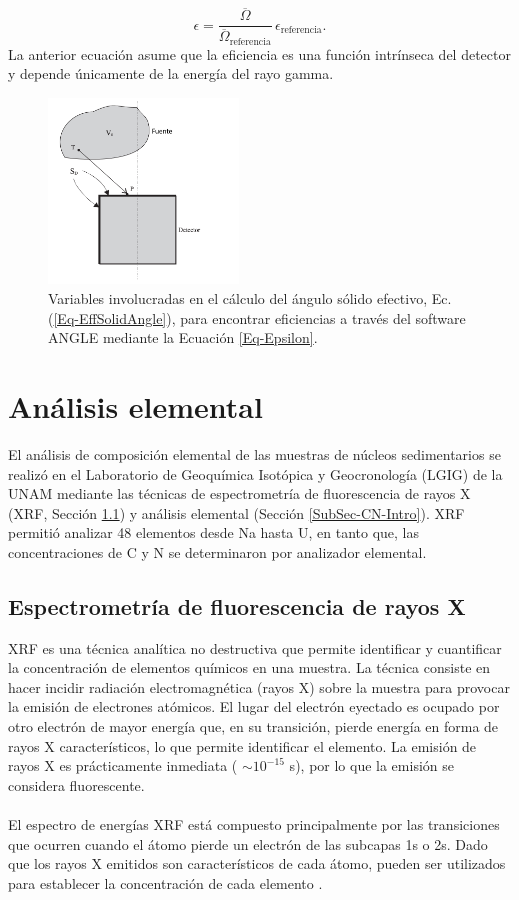 \begin{equation}\label{Eq-Epsilon}
\epsilon = \dfrac{\overline{\Omega}}{\overline{\Omega}_\text{referencia}}\,\epsilon_\text{referencia}.
\end{equation}
La anterior ecuación asume que la eficiencia es una función intrínseca del detector y depende únicamente de la energía del rayo gamma.
\begin{figure}[h]
\centering
\includegraphics[width=0.45\textwidth]{Imagenes/EffectiveSolidAngle-2.png}
\caption{Variables involucradas en el cálculo del ángulo sólido efectivo, Ec. (\ref{Eq-EffSolidAngle}), para encontrar eficiencias a través del software ANGLE mediante la Ecuación \ref{Eq-Epsilon}.}\label{Fig-EffSolidAngle}
\end{figure}
\section{Análisis elemental}\label{Secc-AnalisisElemental}
El análisis de composición elemental de las muestras de núcleos sedimentarios se realizó en el Laboratorio de Geoquímica Isotópica y Geocronología (LGIG) de la UNAM mediante las técnicas de espectrometría de fluorescencia de rayos X (XRF, Sección \ref{SubSec-XRF-Intro}) y análisis elemental (Sección \ref{SubSec-CN-Intro}). XRF permitió analizar 48 elementos desde Na hasta U, en tanto que, las concentraciones de C y N se determinaron por analizador elemental.
	\subsection{Espectrometría de fluorescencia de rayos X}\label{SubSec-XRF-Intro}
XRF es una técnica analítica no destructiva que permite identificar y cuantificar la concentración de elementos químicos en una muestra. La técnica consiste en hacer incidir radiación electromagnética (rayos X) sobre la muestra para provocar la emisión de electrones atómicos. El lugar del electrón eyectado es ocupado por otro electrón de mayor energía que, en su transición, pierde energía en forma de rayos X característicos, lo que permite identificar el elemento. La emisión de rayos X es prácticamente inmediata ( $\sim 10^{-15}$ s), por lo que la emisión se considera fluorescente.  
\\
\\
El espectro de energías XRF está compuesto principalmente por las transiciones que ocurren cuando el átomo pierde un electrón de las subcapas 1s o 2s. Dado que los rayos X emitidos son característicos de cada átomo, pueden ser utilizados para establecer la concentración de cada elemento \cite{verma2007atomic}. 

